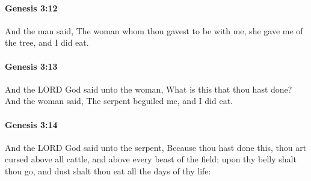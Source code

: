 		\paragraph{Genesis 3:12} %
			\label{GENESIS-3-12}

			And the man said, The woman whom thou gavest to be with me, she gave me of the tree, and I did eat.


		\paragraph{Genesis 3:13} %
			\label{GENESIS-3-13}

			And the LORD God said unto the woman, What is this that thou hast done?  And the woman said, The serpent beguiled me, and I did eat.


		\paragraph{Genesis 3:14} %
			\label{GENESIS-3-14}

			And the LORD God said unto the serpent, Because thou hast done this, thou art cursed above all cattle, and above every beast of the field; upon thy belly shalt thou go, and dust shalt thou eat all the days of thy life:


